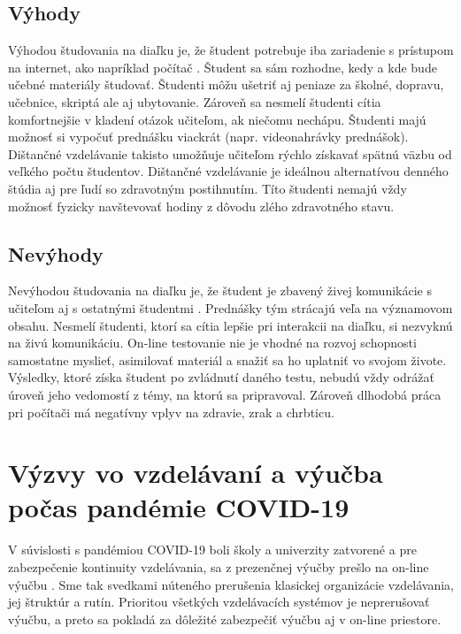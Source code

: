\documentclass[10pt,oneside,slovak,a4paper]{article}
\begin{document}
\subsection{Výhody}
Výhodou študovania na diaľku je, že študent potrebuje iba zariadenie s prístupom na internet, ako napríklad počítač \cite{Sokolova2018}.
Študent sa sám rozhodne, kedy a kde bude učebné materiály študovať. Študenti môžu ušetriť aj peniaze za školné, dopravu, učebnice, skriptá ale aj ubytovanie.
Zároveň sa nesmelí študenti cítia komfortnejšie v kladení otázok učiteľom, ak niečomu nechápu. Študenti majú možnosť si vypočuť prednášku viackrát (napr. videonahrávky prednášok).
Dištančné vzdelávanie takisto umožňuje učiteľom rýchlo získavať spätnú väzbu od veľkého počtu študentov.
Dištančné vzdelávanie je ideálnou alternatívou denného štúdia aj pre ľudí so zdravotným postihnutím.
Títo študenti nemajú vždy možnosť fyzicky navštevovať hodiny z dôvodu zlého zdravotného stavu.

\subsection{Nevýhody}
Nevýhodou študovania na diaľku je, že študent je zbavený živej komunikácie s učiteľom aj s ostatnými študentmi \cite{Sokolova2018}. Prednášky tým strácajú veľa na významovom obsahu.
Nesmelí študenti, ktorí sa cítia lepšie pri interakcii na diaľku, si nezvyknú na živú komunikáciu.
On-line testovanie nie je vhodné na rozvoj schopnosti samostatne myslieť, asimilovať materiál a snažiť sa ho uplatniť vo svojom živote.
Výsledky, ktoré získa študent po zvládnutí daného testu, nebudú vždy odrážať úroveň jeho vedomostí z témy, na ktorú sa pripravoval.
Zároveň dlhodobá práca pri počítači má negatívny vplyv na zdravie, zrak a chrbticu.


\section{Výzvy vo vzdelávaní a výučba počas pandémie COVID-19}
V súvislosti s pandémiou COVID-19 boli školy a univerzity zatvorené a pre zabezpečenie kontinuity vzdelávania, sa z prezenčnej výučby prešlo na on-line výučbu \cite{covid19}.
Sme tak svedkami núteného prerušenia klasickej organizácie vzdelávania, jej štruktúr a rutín. Prioritou všetkých vzdelávacích systémov je neprerušovať výučbu,
a preto sa pokladá za dôležité zabezpečiť výučbu aj v on-line priestore.
\end{document}
